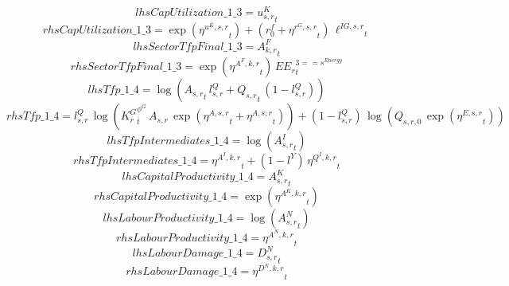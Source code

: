 \begin{dmath*}
lhsCapUtilization\_1\_3 = {{u^K_{s,r}}}_{t}
\end{dmath*}
\begin{dmath*}
rhsCapUtilization\_1\_3 = \exp\left({{\eta^{u^K,s,r}}}_{t}\right)+\left({{r^f_0}}+{{\eta^{r^G,s,r}}}_{t}\right)\, {{\ell^{IG,s,r}}}_{t}
\end{dmath*}
\begin{dmath*}
lhsSectorTfpFinal\_1\_3 = {{A^{F}_{k,r}}}_{t}
\end{dmath*}
\begin{dmath*}
rhsSectorTfpFinal\_1\_3 = \exp\left({{\eta^{A^F,k,r}}}_{t}\right)\, {{EE_r}}_{t}^{3=={{s^{Energy}}}}
\end{dmath*}
\begin{dmath*}
lhsTfp\_1\_4 = \log\left({{A_{s,r}}}_{t}\, {{l^{Q}_{s,r}}}+{{Q_{s,r}}}_{t}\, \left(1-{{l^{Q}_{s,r}}}\right)\right)
\end{dmath*}
\begin{dmath*}
rhsTfp\_1\_4 = {{l^{Q}_{s,r}}}\, \log\left({{K^G_{r}}}_{t}^{{{\phi^{G}}}}\, {{A_{s,r}}}\, \exp\left({{\eta^{A,s,r}}}_{t}+{{\eta^{A,s,r}}}_{t}\right)\right)+\left(1-{{l^{Q}_{s,r}}}\right)\, \log\left({{Q_{s,r,0}}}\, \exp\left({{\eta^{E,s,r}}}_{t}\right)\right)
\end{dmath*}
\begin{dmath*}
lhsTfpIntermediates\_1\_4 = \log\left({{A^{I}_{s,r}}}_{t}\right)
\end{dmath*}
\begin{dmath*}
rhsTfpIntermediates\_1\_4 = {{\eta^{A^{I},k,r}}}_{t}+\left(1-{{l^{Y}}}\right)\, {{\eta^{Q^{I},k,r}}}_{t}
\end{dmath*}
\begin{dmath*}
lhsCapitalProductivity\_1\_4 = {{A^{K}_{s,r}}}_{t}
\end{dmath*}
\begin{dmath*}
rhsCapitalProductivity\_1\_4 = \exp\left({{\eta^{A^{K},k,r}}}_{t}\right)
\end{dmath*}
\begin{dmath*}
lhsLabourProductivity\_1\_4 = \log\left({{A^{N}_{s,r}}}_{t}\right)
\end{dmath*}
\begin{dmath*}
rhsLabourProductivity\_1\_4 = {{\eta^{A^{N},k,r}}}_{t}
\end{dmath*}
\begin{dmath*}
lhsLabourDamage\_1\_4 = {{D^N_{s,r}}}_{t}
\end{dmath*}
\begin{dmath*}
rhsLabourDamage\_1\_4 = {{\eta^{D^{N},k,r}}}_{t}
\end{dmath*}
